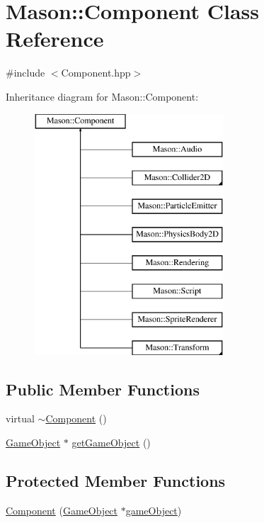 \hypertarget{class_mason_1_1_component}{}\section{Mason\+:\+:Component Class Reference}
\label{class_mason_1_1_component}


{\ttfamily \#include $<$Component.\+hpp$>$}

Inheritance diagram for Mason\+:\+:Component\+:\begin{figure}[H]
\begin{center}
\leavevmode
\includegraphics[height=9.000000cm]{class_mason_1_1_component}
\end{center}
\end{figure}
\subsection*{Public Member Functions}
\begin{DoxyCompactItemize}
\item 
virtual \hyperlink{class_mason_1_1_component_ab8378fa275af98e568a7e91d33d867af}{$\sim$\+Component} ()
\item 
\hyperlink{class_mason_1_1_game_object}{Game\+Object} $\ast$ \hyperlink{class_mason_1_1_component_abed36db99f1ee0ba84a5fb8485e17428}{get\+Game\+Object} ()
\end{DoxyCompactItemize}
\subsection*{Protected Member Functions}
\begin{DoxyCompactItemize}
\item 
\hyperlink{class_mason_1_1_component_a98d3a7d72f88dc7e67c946c78afb8243}{Component} (\hyperlink{class_mason_1_1_game_object}{Game\+Object} $\ast$\hyperlink{class_mason_1_1_component_a30030370c35f5562cbbbb0927b0448c8}{game\+Object})
\end{DoxyCompactItemize}
